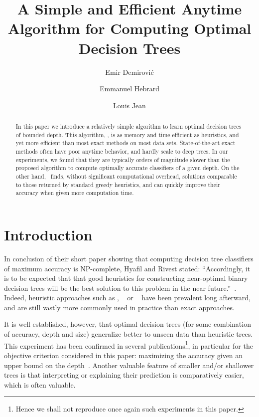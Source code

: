 \documentclass{llncs}
\title{A Simple and Efficient Anytime Algorithm for Computing Optimal Decision Trees}
\author{Emir Demirovi\'c\inst{1} \and Emmanuel Hebrard\inst{2} \and Louis Jean\inst{2}}
\institute{TU DELFT, The Netherlands, email: e.demirovic@tudelft.nl
  \and LAAS-CNRS, Universit\'e de Toulouse, CNRS, France, email: \{hebrard,ljean\}@laas.fr}
\begin{document}
\maketitle






\begin{abstract}
	In this paper we introduce a relatively {simple} algorithm to learn optimal decision trees of bounded depth. This algorithm, \budalg, is as memory and time efficient as heuristics, and yet more efficient than most exact methods on most data sets. State-of-the-art exact methods often have poor anytime behavior, and hardly scale to deep trees. In our experiments, we found that they are typically orders of magnitude slower than the proposed algorithm to compute optimally accurate classifiers of a given depth.
On the other hand, \budalg\ finds, without significant computational overhead, solutions comparable to those returned by standard greedy heuristics, and can quickly improve their accuracy when given more computation time.
\end{abstract}

\section{Introduction}

In conclusion of their short paper showing that computing decision tree classifiers of maximum accuracy is NP-complete, Hyafil and Rivest stated: ``Accordingly, it is to be expected that that good heuristics for constructing near-optimal binary decision trees will be the best solution to this problem in the near future.''~\cite{NPhardTrees}. Indeed, heuristic approaches such as \cart\cite{breiman1984classification}, \idthree~\cite{10.1023/A:1022643204877} or \cfour~\cite{c4-5} have been prevalent long afterward, and are still vastly more commonly used in practice than exact approaches.


It is well established, however, that optimal decision trees (for some combination of accuracy, depth and size) generalize better to unseen data than heuristic trees. This experiment has been confirmed in several publications\footnote{Hence we shall not reproduce once again such experiments in this paper.}, in particular for the objective criterion considered in this paper: maximizing the accuracy given an upper bound on the depth~\cite{avellanedaefficient,bertsimas2017optimal,bertsimas2007classification,DBLP:conf/ijcai/Hu0HH20,DBLP:journals/corr/abs-2007-12652,dl8}. 
Another valuable feature of smaller and/or shallower trees is that interpreting or explaining their prediction is comparatively easier, which is often valuable. 
\end{document}
